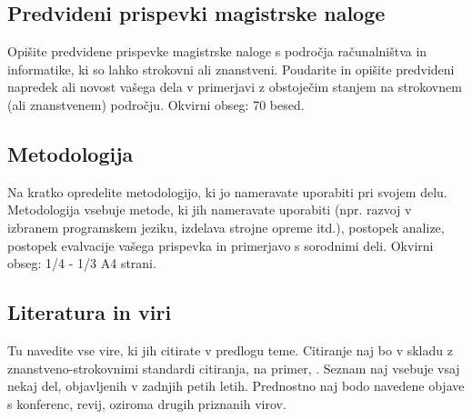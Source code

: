 \documentclass[a4paper, 12pt]{article}
\newcommand\cmnt[1]{\textcolor{munsell}{#1}}
\begin{document}
\subsection{Predvideni prispevki magistrske naloge}

\cmnt{Opišite predvidene prispevke magistrske naloge s področja računalništva in informatike, ki so lahko strokovni ali znanstveni. Poudarite in opišite predvideni napredek ali novost vašega dela v primerjavi z obstoječim stanjem na strokovnem (ali znanstvenem) področju.  Okvirni obseg: 70 besed.}


\subsection{Metodologija}

\cmnt{Na kratko opredelite metodologijo, ki jo nameravate uporabiti pri svojem delu. Metodologija vsebuje metode, ki jih nameravate uporabiti (npr. razvoj v izbranem programskem jeziku, izdelava strojne opreme itd.), postopek analize, postopek evalvacije vašega prispevka in primerjavo s sorodnimi deli.  Okvirni obseg: 1/4 - 1/3 A4 strani.}


\subsection{Literatura in viri}
\label{literatura}

\cmnt{Tu navedite vse vire, ki jih citirate v predlogu teme. Citiranje naj bo v skladu z znanstveno-strokovnimi standardi citiranja, na primer, \cite{Zivkovic2004}. Seznam naj vsebuje vsaj nekaj del, objavljenih v zadnjih petih letih. Prednostno naj bodo navedene objave s konferenc, revij, oziroma drugih priznanih virov.}

\renewcommand\refname{}
\vspace{-50px}




%
\end{document}

